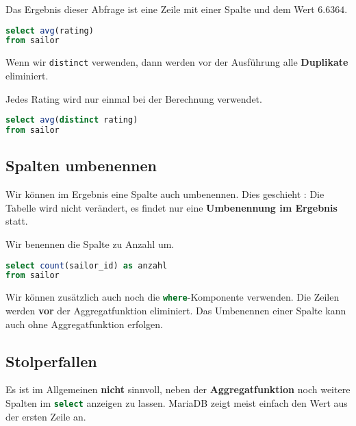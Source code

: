 \begin{example}
Das Ergebnis dieser Abfrage ist eine Zeile mit einer Spalte und dem Wert $6.6364$.
\begin{lstlisting}[language=SQL, upquote=true]
select avg(rating)
from sailor
\end{lstlisting}
\end{example}

Wenn wir \lstinline{distinct} verwenden, dann werden vor der Ausführung alle \textbf{Duplikate} eliminiert. 

\begin{example}
Jedes Rating wird nur einmal bei der Berechnung verwendet.
\begin{lstlisting}[language=SQL, upquote=true]
select avg(distinct rating)
from sailor
\end{lstlisting}
\end{example}

\subsection{Spalten umbenennen}

Wir können im Ergebnis eine Spalte auch umbenennen. Dies geschieht : Die Tabelle wird nicht verändert, es findet nur eine \textbf{Umbenennung im Ergebnis} statt.

\begin{example}
Wir benennen die Spalte zu Anzahl um.
\begin{lstlisting}[showstringspaces=off, language=SQL]
select count(sailor_id) as anzahl
from sailor
\end{lstlisting}
\end{example}

Wir können zusätzlich auch noch die \lstinline[language=SQL]{where}-Komponente verwenden. Die Zeilen werden \textbf{vor} der Aggregatfunktion eliminiert. Das Umbenennen einer Spalte kann auch ohne Aggregatfunktion erfolgen.

\subsection{Stolperfallen}

Es ist im Allgemeinen \textbf{nicht} sinnvoll, neben der \textbf{Aggregatfunktion} noch weitere Spalten im \lstinline[language=SQL]{select} anzeigen zu lassen. MariaDB zeigt meist einfach den Wert aus der ersten Zeile an.

